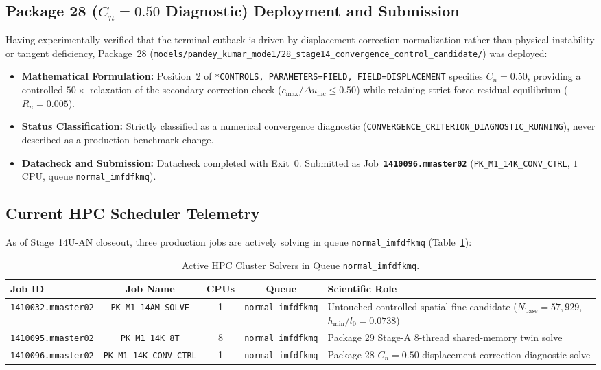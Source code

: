\subsection{Package 28 (\texorpdfstring{$C_n = 0.50$}{Cn = 0.50} Diagnostic) Deployment and Submission}
\label{subsec:stage14uan_pkg28_submission}

Having experimentally verified that the terminal cutback is driven by displacement-correction normalization rather than physical instability or tangent deficiency, Package~28 (\texttt{models/pandey\_kumar\_mode1/28\_stage14\_convergence\_control\_candidate/}) was deployed:
\begin{itemize}
  \item \textbf{Mathematical Formulation:} Position~2 of \texttt{*CONTROLS, PARAMETERS=FIELD, FIELD=DISPLACEMENT} specifies $C_n = 0.50$, providing a controlled $50\times$ relaxation of the secondary correction check ($c_{\max} / \Delta u_{\mathrm{inc}} \le 0.50$) while retaining strict force residual equilibrium ($R_n = 0.005$).
  \item \textbf{Status Classification:} Strictly classified as a numerical convergence diagnostic (\texttt{CONVERGENCE\_CRITERION\_DIAGNOSTIC\_RUNNING}), never described as a production benchmark change.
  \item \textbf{Datacheck and Submission:} Datacheck completed with Exit~0. Submitted as Job~\textbf{\texttt{1410096.mmaster02}} (\texttt{PK\_M1\_14K\_CONV\_CTRL}, $1$ CPU, queue \texttt{normal\_imfdfkmq}).
\end{itemize}

\subsection{Current HPC Scheduler Telemetry}
\label{subsec:stage14uan_active_telemetry}

As of Stage~14U-AN closeout, three production jobs are actively solving in queue \texttt{normal\_imfdfkmq} (Table~\ref{tab:stage14uan_active_telemetry}):

\begin{table}[htbp]
\centering
\small
\caption{Active HPC Cluster Solvers in Queue \texttt{normal\_imfdfkmq}.}
\label{tab:stage14uan_active_telemetry}
\begin{tabularx}{\textwidth}{l c c c X}
\toprule
\textbf{Job ID} & \textbf{Job Name} & \textbf{CPUs} & \textbf{Queue} & \textbf{Scientific Role} \\
\midrule
\texttt{1410032.mmaster02} & \texttt{PK\_M1\_14AM\_SOLVE} & 1 & \texttt{normal\_imfdfkmq} & Untouched controlled spatial fine candidate ($N_{\mathrm{base}} = 57,929$, $h_{\min}/l_0 = 0.0738$) \\
\texttt{1410095.mmaster02} & \texttt{PK\_M1\_14K\_8T} & 8 & \texttt{normal\_imfdfkmq} & Package 29 Stage-A 8-thread shared-memory twin solve \\
\texttt{1410096.mmaster02} & \texttt{PK\_M1\_14K\_CONV\_CTRL} & 1 & \texttt{normal\_imfdfkmq} & Package 28 $C_n = 0.50$ displacement correction diagnostic solve \\
\bottomrule
\end{tabularx}
\end{table}

